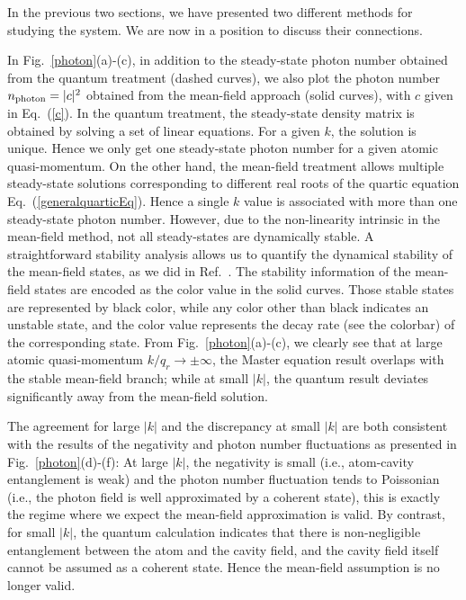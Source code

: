 \documentclass[atoms,article,submit,moreauthors,dvi2pdf,12pt,a4paper]{mdpi}
\begin{document}
In the previous two sections, we have presented two different methods for studying the system. We are now in a position to discuss their connections.

In Fig.~\ref{photon}(a)-(c), in addition to the steady-state photon number obtained from the quantum treatment (dashed curves), we also plot the photon number $n_{\rm photon}=|c|^2$ obtained from the mean-field approach (solid curves), with $c$ given in Eq.~(\ref{c}). In the quantum treatment, the steady-state density matrix is obtained by solving a set of linear equations. For a given $k$, the solution is unique. Hence we only get one steady-state photon number for a given atomic quasi-momentum. On the other hand, the mean-field treatment allows multiple steady-state solutions corresponding to different real roots of the quartic equation Eq.~(\ref{generalquarticEq}). Hence a single $k$ value is associated with more than one steady-state photon number. However, due to the non-linearity intrinsic in the mean-field method, not all steady-states are dynamically stable. A straightforward stability analysis allows us to quantify the dynamical stability of the mean-field states, as we did in Ref.~\cite{cavitySOC}. The stability information of the mean-field states are encoded as the color value in the solid curves. Those stable states are represented by black color, while any color other than black indicates an unstable state, and the color value represents the decay rate (see the colorbar) of the corresponding state. From Fig.~\ref{photon}(a)-(c), we clearly see that at large atomic quasi-momentum $k/q_r \rightarrow  \pm \infty$, the Master equation result overlaps with the stable mean-field branch; while at small $|k|$, the quantum result deviates significantly away from the mean-field solution.

The agreement for large $|k|$ and the discrepancy at small $|k|$ are both consistent with the results of the negativity and photon number fluctuations as presented in Fig.~\ref{photon}(d)-(f): At large $|k|$, the negativity is small (i.e., atom-cavity entanglement is weak) and the photon number fluctuation tends to Poissonian (i.e., the photon field is well approximated by a coherent state), this is exactly the regime where we expect the mean-field approximation is valid. By contrast, for small $|k|$, the quantum calculation indicates that there is non-negligible entanglement between the atom and the cavity field, and the cavity field itself cannot be assumed as a coherent state. Hence the mean-field assumption is no longer valid.
\end{document}

